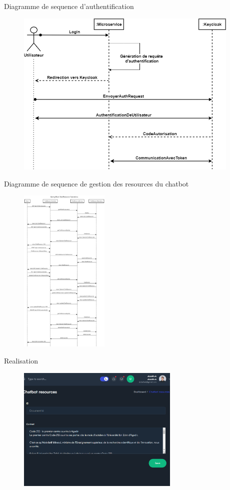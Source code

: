 \begin{frame}{Diagramme de sequence d'authentification}
    \begin{figure}[H]
        \centering
        \includegraphics[height=8cm]{assets/images/keycloak-seq.png}
    \end{figure}
\end{frame}

\begin{frame}{Diagramme de sequence de gestion des resources du chatbot}
    \begin{figure}[H]
        \centering
        \includegraphics[height=8cm]{assets/images/chat-res-seq.png}
    \end{figure}
\end{frame}

\begin{frame}{Realisation}
    \begin{figure}[H]
        \centering
        \includegraphics[height=6cm]{assets/images/admin-doc.png}
    \end{figure}
\end{frame}



